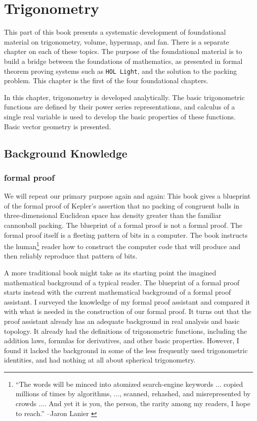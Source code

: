 \chapter{Trigonometry}
\label{part:trig}
%

\begin{summary}
   This  part of this book presents a systematic
  development of foundational material on trigonometry, volume,
  hypermap, and fan.  There is a separate chapter on each of these
  topics.  The purpose of the foundational material is to build a
  bridge between the foundations of mathematics, as presented in
  formal theorem proving systems such as {\tt HOL Light}, and the
  solution to the packing problem.  This chapter is the first of the
  four foundational chapters.

  In this chapter, trigonometry is developed analytically.  The basic
  trigonometric functions are defined by their power series
  representations, and calculus of a single real variable is used to
  develop the basic properties of these functions.  Basic vector
  geometry is presented.
\end{summary}


\section{Background Knowledge}

\subsection{formal proof}

We will repeat our primary purpose again and again: This book gives a
blueprint of the formal proof of Kepler's assertion that no packing of
congruent balls in three-dimensional Euclidean space has density
greater than the familiar cannonball packing.  The blueprint of a
formal proof is not a formal proof.  The formal proof itself is a
fleeting pattern of bits in a computer.  The book instructs the
human\footnote{``The words will be minced into atomized search-engine
  keywords $\ldots$ copied millions of times by algorithms, $\ldots$,
  scanned, rehashed, and misrepresented by crowds $\ldots$.  And yet
  it is you, the person, the rarity among my readers, I hope to
  reach.'' --Jaron Lanier \cite{Lanier}} reader how to construct the
computer code that will produce and then reliably reproduce that
pattern of bits.

A more traditional book might take as its starting point the imagined
mathematical background of a typical reader.  The blueprint of a
formal proof starts instead with the current mathematical background
of a formal proof assistant.  I surveyed the knowledge of my formal
proof assistant and compared it with what is needed in the
construction of our formal proof.  It turns out that the proof
assistant already has an adequate background in real analysis and
basic topology.  It already had the definitions of trigonometric
functions, including the addition laws, formulas for derivatives, and
other basic properties.  However, I found it lacked the background in some of
the less frequently used trigonometric identities, and had nothing at
all about spherical trigonometry.

